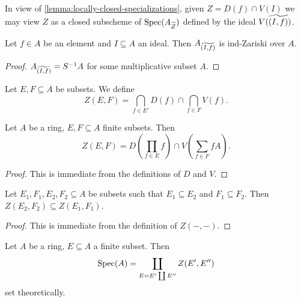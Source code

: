 In view of \ref{lemma:locally-closed-specializations}, given $Z = D(f) \cap V(I)$ we may
view $Z$ as a closed subscheme of $\mathrm{Spec}(A_{\widetilde{Z}})$ defined by the ideal
$V( \widetilde{(I, f)})$.

\begin{lemma}
    Let $f \in A$ be an element and $I \subseteq A$ an ideal. Then
    $A_{\widetilde{(I, f)}}$ is ind-Zariski over $A$.
    \label{lemma:tilde-locclosed-ind-zariski}
    \leanok
\end{lemma}

\begin{proof}
    $A_{\widetilde{(I, f)}} = S^{-1} A$ for some multiplicative subset $A$.
\end{proof}

\begin{definition}
    Let $E, F \subseteq A$ be subsets. We define
    \[
    Z(E, F) = \bigcap_{f \in E'} D(f) \cap \bigcap_{f \in F} V(f)
    .\]
    \label{def:subset-stratum}
    \leanok
\end{definition}

\begin{lemma}
    Let $A$ be a ring, $E, F \subseteq A$ finite subsets. Then
    \[
    Z(E, F) = D\left( \prod_{f \in E}  f \right) \cap V\left( \sum_{f \in F} fA \right)
    .\]
    \label{lemma:subset-stratum-equals-inter}
    \leanok
\end{lemma}

\begin{proof}
    This is immediate from the definitions of $D$ and $V$.
\end{proof}

\begin{lemma}
    Let $E_1, F_1, E_2, F_2 \subseteq A$ be subsets such that $E_1 \subseteq E_2$ and
    $F_1 \subseteq F_2$. Then $Z(E_2, F_2) \subseteq Z(E_1, F_1)$.
    \label{lemma:subset-stratum-mono}
    \leanok
\end{lemma}

\begin{proof}
    This is immediate from the definition of $Z(-, -)$.
\end{proof}

\begin{lemma}
    Let $A$ be a ring, $E \subseteq A$ a finite subset. Then
    \[
        \mathrm{Spec}(A) = \coprod_{E = E' \coprod E''} Z(E', E'')
    \] set theoretically.
    \label{lemma:subset-stratification}
\end{lemma}

